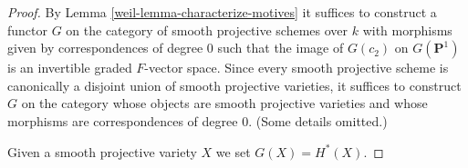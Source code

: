\begin{proof}

By Lemma \ref{weil-lemma-characterize-motives} it suffices to construct a functor
$G$ on the category of smooth projective schemes over $k$
with morphisms given by correspondences of degree $0$ such that
the image of $G(c_2)$ on $G(\mathbf{P}^1)$ is an invertible graded
$F$-vector space.
Since every smooth projective scheme is canonically a disjoint
union of smooth projective varieties, it suffices to construct
$G$ on the category whose objects are smooth projective varieties
and whose morphisms are correspondences of degree $0$. (Some details
omitted.)

\medskip\noindent
Given a smooth projective variety $X$ we set $G(X) = H^*(X)$.


\end{proof}
